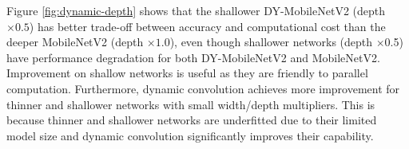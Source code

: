 \documentclass[10pt,twocolumn,letterpaper]{article}
\begin{document}
 Figure \ref{fig:dynamic-depth} shows that the shallower DY-MobileNetV2 (depth $\times0.5$) has better trade-off between accuracy and computational cost than the deeper MobileNetV2 (depth $\times 1.0$), even though shallower networks (depth $\times$0.5) have performance degradation for both DY-MobileNetV2 and MobileNetV2. Improvement on shallow networks is useful as they are friendly to parallel computation.
Furthermore, dynamic convolution achieves more improvement for thinner and shallower networks with small width/depth multipliers. This is because thinner and shallower networks are underfitted due to their limited model size and dynamic convolution significantly improves their capability. 
\
\end{document}
